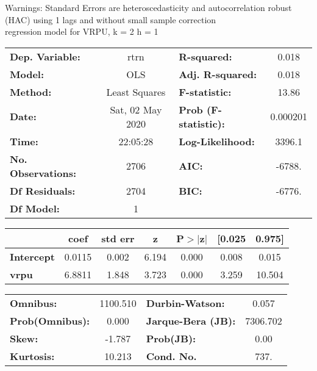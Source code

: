 Warnings: \newline
 [1] Standard Errors are heteroscedasticity and autocorrelation robust (HAC) using 1 lags and without small sample correction\\ 

regression model for VRPU, k = 2 h = 1\begin{center}
\begin{tabular}{lclc}
\toprule
\textbf{Dep. Variable:}    &       rtrn       & \textbf{  R-squared:         } &     0.018   \\
\textbf{Model:}            &       OLS        & \textbf{  Adj. R-squared:    } &     0.018   \\
\textbf{Method:}           &  Least Squares   & \textbf{  F-statistic:       } &     13.86   \\
\textbf{Date:}             & Sat, 02 May 2020 & \textbf{  Prob (F-statistic):} &  0.000201   \\
\textbf{Time:}             &     22:05:28     & \textbf{  Log-Likelihood:    } &    3396.1   \\
\textbf{No. Observations:} &        2706      & \textbf{  AIC:               } &    -6788.   \\
\textbf{Df Residuals:}     &        2704      & \textbf{  BIC:               } &    -6776.   \\
\textbf{Df Model:}         &           1      & \textbf{                     } &             \\
\bottomrule
\end{tabular}
\begin{tabular}{lcccccc}
                   & \textbf{coef} & \textbf{std err} & \textbf{z} & \textbf{P$> |$z$|$} & \textbf{[0.025} & \textbf{0.975]}  \\
\midrule
\textbf{Intercept} &       0.0115  &        0.002     &     6.194  &         0.000        &        0.008    &        0.015     \\
\textbf{vrpu}      &       6.8811  &        1.848     &     3.723  &         0.000        &        3.259    &       10.504     \\
\bottomrule
\end{tabular}
\begin{tabular}{lclc}
\textbf{Omnibus:}       & 1100.510 & \textbf{  Durbin-Watson:     } &    0.057  \\
\textbf{Prob(Omnibus):} &   0.000  & \textbf{  Jarque-Bera (JB):  } & 7306.702  \\
\textbf{Skew:}          &  -1.787  & \textbf{  Prob(JB):          } &     0.00  \\
\textbf{Kurtosis:}      &  10.213  & \textbf{  Cond. No.          } &     737.  \\
\bottomrule
\end{tabular}
\end{center}

